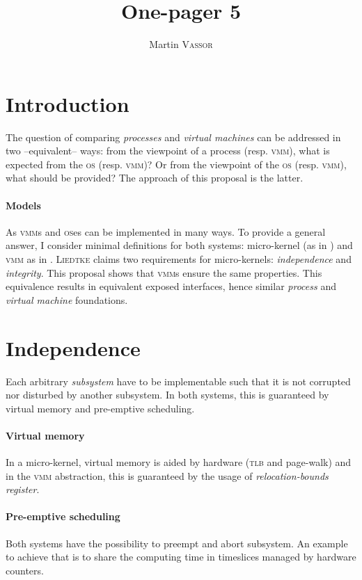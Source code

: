 \documentclass[twocolumn]{article}
\title{One-pager 5}
\author{Martin \textsc{Vassor}}
\date{}
\newcommand{\vmm}[0]{\textsc{vmm}}
\newcommand{\os}[0]{\textsc{os}}
\begin{document}
\maketitle

\section{Introduction}
The question of comparing \emph{processes} and \emph{virtual machines} can be addressed in two --equivalent-- ways: from the viewpoint of a process (resp. \vmm), what is expected from the \os{} (resp. \vmm)? Or from the viewpoint of the \os{} (resp. \vmm), what should be provided? The approach of this proposal is the latter.

\paragraph{Models}
As \vmm{}s and \os{}es can be implemented in many ways. To provide a general answer, I consider minimal definitions for both systems: micro-kernel (as in \cite{liedtke_micro-kernel_1995}) and \vmm{} as in \cite{popek_formal_1974}.
\textsc{Liedtke} claims two requirements for micro-kernels: \emph{independence} and \emph{integrity}. This proposal shows that \vmm{}s ensure the same properties. This equivalence results in equivalent exposed interfaces, hence similar \emph{process} and \emph{virtual machine} foundations.

\section{Independence}
\label{sec:indep}
Each arbitrary \emph{subsystem} have to be implementable such that it is not corrupted nor disturbed by another subsystem. In both systems, this is guaranteed by virtual memory and pre-emptive scheduling. 

\paragraph{Virtual memory} In a micro-kernel, virtual memory is aided by hardware (\textsc{tlb} and page-walk) and in the \vmm{} abstraction, this is guaranteed by the usage of \emph{relocation-bounds register}.


\paragraph{Pre-emptive scheduling} Both systems have the possibility to preempt and abort subsystem.  An example to achieve that is to share the computing time in timeslices managed by hardware counters.
\end{document}

